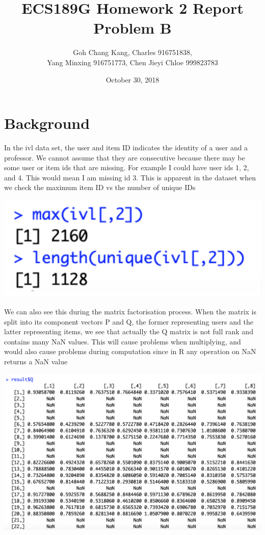 \documentclass{article}
\begin{document}
\begin{titlepage}
\title{ECS189G Homework 2 Report Problem B}
\author{Goh Chang Kang, Charles 916751838, \\
Yang Minxing 916751773, Chen Jieyi Chloe 999823783}

\date{October 30, 2018}
\maketitle
\end{titlepage}


\section{Background}

In the ivl data set, the user and item ID indicates the identity of a user and a professor. We cannot assume that they are consecutive because there may be some user or item ids that are missing. For example I could have user ids 1, 2, and 4. This would mean I am missing id 3. This is apparent in the dataset when we check the maximum item ID vs the number of unique IDs

\includegraphics[scale=0.5]{NonConsecutiveIDExample.png}

We can also see this during the matrix factorisation process. When the matrix is split into its component vectors P and Q, the former representing users and the latter representing items, we see that actually the Q matrix is not full rank and contains many NaN values.  This will cause problems when multiplying, and would also cause problems during computation since in R any operation on NaN returns a NaN value

\includegraphics[scale=0.4]{ItemIDMissingExample.png}
\end{document}
